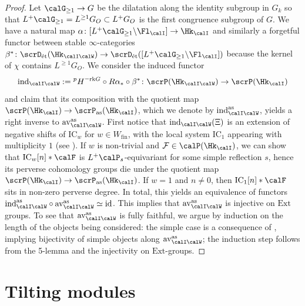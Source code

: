 \documentclass[10pt, reqno]{amsart}
\theoremstyle{plain}
\theoremstyle{definition}
\newcommand{\minus}{\scalebox{0.75}[1.0]{$-$}}
\numberwithin{equation}{section}
\begin{document}
\begin{proof}
	Let $\calG_{\geq 1} \to G$ be the dilatation along the identity subgroup in $G_k$ so that $L^+\calG_{\geq 1} = L^{\geq 1}G_O\subset L^+G_O$ is the first congruence subgroup of $G$. We have a natural map $\alpha\colon [L^+\calG_{\geq 1} \backslash \Fl_{ \calI}] \to \Hk_{\calI}$ and similarly a forgetful functor between stable $\infty$-categories $\beta^*\colon \scrD_{\mathrm{\acute{e}t}}(\Hk_{\calI\calW}) \to \scrD_{\mathrm{\acute{e}t}}([L^+\calG_{\geq 1} \backslash \Fl_{ \calI}] )$ because the kernel of $\chi$ contains $L^{\geq 1}G_O$. We consider the induced functor 
	\begin{equation}
		\mathrm{ind}_{\calI\calW}:= {}^pH^{\minus\mathrm{rk}G}\circ R\alpha_*\circ \beta^*\colon \scrP(\Hk_{\calI\calW}) \to \scrP(\Hk_{\calI})
	\end{equation}
	and claim that its composition with the quotient map $\scrP(\Hk_{\calI}) \to \scrP_{\mathrm{as}}(\Hk_{\calI})$, which we denote by $\mathrm{ind}_{\calI\calW}^{\mathrm{as}}$, yields a right inverse to $\mathrm{av}^{\mathrm{as}}_{\calI\calW}$. First notice that $ \mathrm{ind}_{\calI\calW}(\Xi)$ is an extension of negative shifts of $\mathrm{IC}_w$ for $w\in W_{\mathrm{fin}}$, with the local system $\mathrm{IC}_1$ appearing with multiplicity $1$ (see \cite[Lemma 6.4.8]{AR}). If $w$ is non-trivial and $\mathcal{F}\in \calP(\Hk_\calI)$, we can show that $\mathrm{IC}_w[n] \ast \calF$ is $L^+\calP_s$-equivariant for some simple reflection $s$, hence its perverse cohomology groups die under the quotient map $\scrP(\Hk_{\calI}) \to \scrP_{\mathrm{as}}(\Hk_{\calI})$. If $w=1$ and $n\neq 0$, then $\mathrm{IC}_1[n]\ast \calF$ sits in non-zero perverse degree. In total, this yields an equivalence of functors $\mathrm{ind}_{\calI\calW}^{\mathrm{as}} \circ \mathrm{av}_{\calI\calW}^{\mathrm{as}} \simeq \mathrm{id}$. This implies that $\mathrm{av}_{\calI\calW}^{\mathrm{as}}$ is injective on $\mathrm{Ext}$ groups. To see that $\mathrm{av}_{\calI\calW}^{\mathrm{as}}$ is fully faithful, we argue by induction on the length of the objects being considered: the simple case is a consequence of , implying bijectivity of simple objects along $\mathrm{av}_{\calI\calW}^{\mathrm{as}}$; the induction step follows from the 5-lemma and the injectivity on $\mathrm{Ext}$-groups.
\end{proof}

\section{Tilting modules}	
\end{document}

